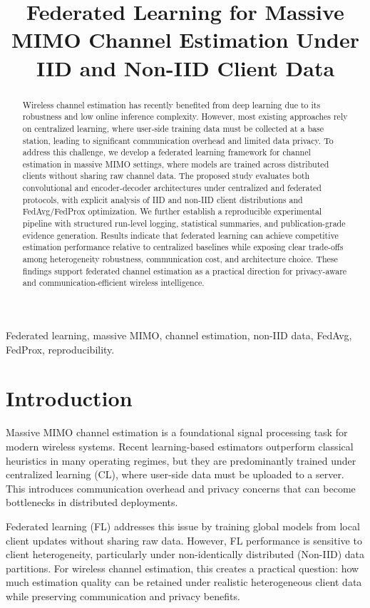 \documentclass[onecolumn]{IEEEtran}
\title{Federated Learning for Massive MIMO Channel Estimation Under IID and Non-IID Client Data}
\author{\IEEEauthorblockN{Anonymous Authors}
\IEEEauthorblockA{Anonymous Institution\\
Email: anonymous@domain.com}}
\begin{document}
\maketitle

\begin{abstract}
Wireless channel estimation has recently benefited from deep learning due to its robustness and low online inference complexity. However, most existing approaches rely on centralized learning, where user-side training data must be collected at a base station, leading to significant communication overhead and limited data privacy. To address this challenge, we develop a federated learning framework for channel estimation in massive MIMO settings, where models are trained across distributed clients without sharing raw channel data. The proposed study evaluates both convolutional and encoder-decoder architectures under centralized and federated protocols, with explicit analysis of IID and non-IID client distributions and FedAvg/FedProx optimization. We further establish a reproducible experimental pipeline with structured run-level logging, statistical summaries, and publication-grade evidence generation. Results indicate that federated learning can achieve competitive estimation performance relative to centralized baselines while exposing clear trade-offs among heterogeneity robustness, communication cost, and architecture choice. These findings support federated channel estimation as a practical direction for privacy-aware and communication-efficient wireless intelligence.
\end{abstract}

\begin{IEEEkeywords}
Federated learning, massive MIMO, channel estimation, non-IID data, FedAvg, FedProx, reproducibility.
\end{IEEEkeywords}

\section{Introduction}
Massive MIMO channel estimation is a foundational signal processing task for modern wireless systems. Recent learning-based estimators outperform classical heuristics in many operating regimes, but they are predominantly trained under centralized learning (CL), where user-side data must be uploaded to a server. This introduces communication overhead and privacy concerns that can become bottlenecks in distributed deployments.

Federated learning (FL) addresses this issue by training global models from local client updates without sharing raw data. However, FL performance is sensitive to client heterogeneity, particularly under non-identically distributed (Non-IID) data partitions. For wireless channel estimation, this creates a practical question: how much estimation quality can be retained under realistic heterogeneous client data while preserving communication and privacy benefits.
\end{document}
